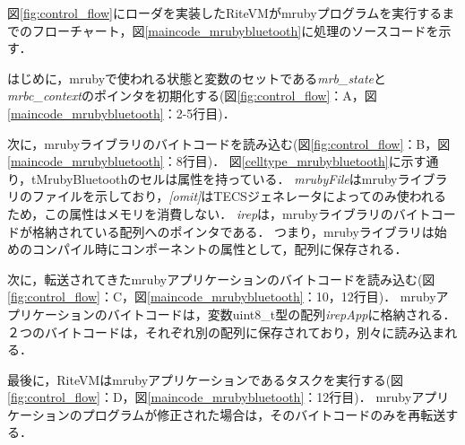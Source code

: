 \documentclass[submit,techrep]{ipsj}
\begin{document}
図\ref{fig:control_flow}にローダを実装したRiteVMがmrubyプログラムを実行するまでのフローチャート，図\ref{maincode_mrubybluetooth}に処理のソースコードを示す．

はじめに，mrubyで使われる状態と変数のセットである{\it mrb\_state}と{\it mrbc\_context}のポインタを初期化する(図\ref{fig:control_flow}：A，図\ref{maincode_mrubybluetooth}：2-5行目)．

次に，mrubyライブラリのバイトコードを読み込む(図\ref{fig:control_flow}：B，図\ref{maincode_mrubybluetooth}：8行目)．
図\ref{celltype_mrubybluetooth}に示す通り，tMrubyBluetoothのセルは属性を持っている．
{\it mrubyFile}はmrubyライブラリのファイルを示しており，{\it [omit]}はTECSジェネレータによってのみ使われるため，この属性はメモリを消費しない．
{\it irep}は，mrubyライブラリのバイトコードが格納されている配列へのポインタである．
つまり，mrubyライブラリは始めのコンパイル時にコンポーネントの属性として，配列に保存される．

次に，転送されてきたmrubyアプリケーションのバイトコードを読み込む(図\ref{fig:control_flow}：C，図\ref{maincode_mrubybluetooth}：10，12行目)．
mrubyアプリケーションのバイトコードは，変数uint8\_t型の配列{\it irepApp}に格納される．
２つのバイトコードは，それぞれ別の配列に保存されており，別々に読み込まれる．

最後に，RiteVMはmrubyアプリケーションであるタスクを実行する(図\ref{fig:control_flow}：D，図\ref{maincode_mrubybluetooth}：12行目)．
mrubyアプリケーションのプログラムが修正された場合は，そのバイトコードのみを再転送する．
\end{document}
